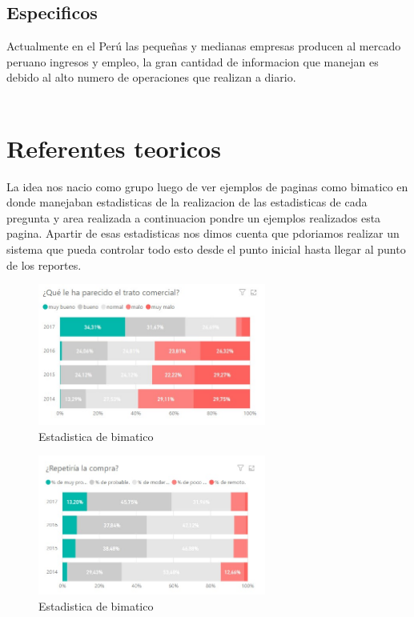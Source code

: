 \documentclass[twoside,twocolumn]{article}
\begin{document}
\subsection{Especificos}
Actualmente en el Perú las pequeñas y medianas empresas producen al mercado peruano ingresos y empleo, la gran cantidad de informacion que manejan es debido al alto numero de operaciones que realizan a diario.\\ \\

\section{Referentes teoricos}
La idea nos nacio como grupo luego de ver ejemplos de paginas como bimatico en donde manejaban estadisticas de la realizacion de las estadisticas de cada pregunta y area realizada
a continuacion pondre un ejemplos realizados esta pagina. Apartir de esas estadisticas nos dimos cuenta que pdoriamos realizar un sistema que pueda controlar todo esto desde el punto inicial hasta llegar al punto de los reportes.
\begin{figure}[htb]
	\begin{center}
		\includegraphics[width=7.5cm]{./IMAGENES/esta1} 
		\caption{Estadistica de bimatico}
	\end{center}
\end{figure}
\begin{figure}[htb]
	\begin{center}
		\includegraphics[width=7.5cm]{./IMAGENES/esta2} 
		\caption{Estadistica de bimatico}
	\end{center}
\end{figure}
\end{document}
